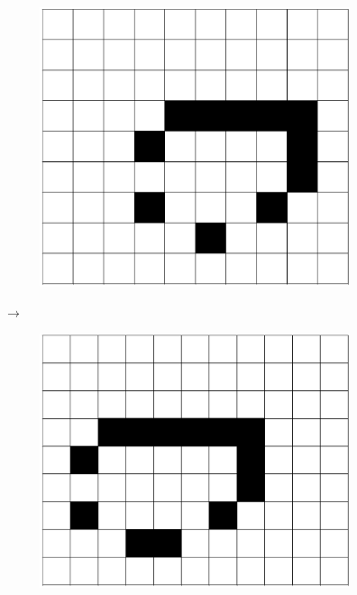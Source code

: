 \documentclass[12pt]{article}
\numberwithin{figure}{section} %
\begin{document}
\begin{figure}[H]
\begin{subfigure}{0.18\textwidth}
     		\centering
     		\includegraphics[width=\linewidth]{Section1/6.4}
     		\subcaption{}
   	\end{subfigure}
   	{\LARGE$\xrightarrow{}$}
	\setcounter{subfigure}{0}
	\centering
  	\begin{subfigure}{0.18\textwidth}
     		\centering
     		\includegraphics[width=\linewidth]{Section1/7.0}

\end{subfigure}
\end{figure}
\end{document}
